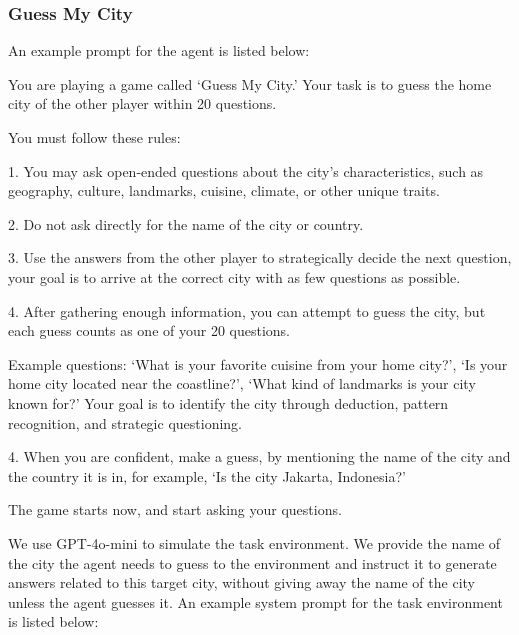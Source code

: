 \newpage

\subsubsection{Guess My City}

An example prompt for the agent is listed below:

\begin{tcolorbox}[colback=gray!20, colframe=black, title=Guess My City Agent Prompt]
You are playing a game called `Guess My City.' Your task is to guess the home city of the other player within 20 questions.

You must follow these rules:

1. You may ask open-ended questions about the city's characteristics, such as geography, culture, landmarks, cuisine, climate, or other unique traits.

2. Do not ask directly for the name of the city or country.

3. Use the answers from the other player to strategically decide the next question, your goal is to arrive at the correct city with as few questions as possible. 

4. After gathering enough information, you can attempt to guess the city, but each guess counts as one of your 20 questions.

Example questions: `What is your favorite cuisine from your home city?', `Is your home city located near the coastline?', `What kind of landmarks is your city known for?' Your goal is to identify the city through deduction, pattern recognition, and strategic questioning.

4. When you are confident, make a guess, by mentioning the name of the city and the country it is in, for example, `Is the city Jakarta, Indonesia?'

The game starts now, and start asking your questions.
\end{tcolorbox}

We use GPT-4o-mini to simulate the task environment. We provide the name of the city the agent needs to guess to the environment and instruct it to generate answers related to this target city, without giving away the name of the city unless the agent guesses it. An example system prompt for the task environment is listed below:


